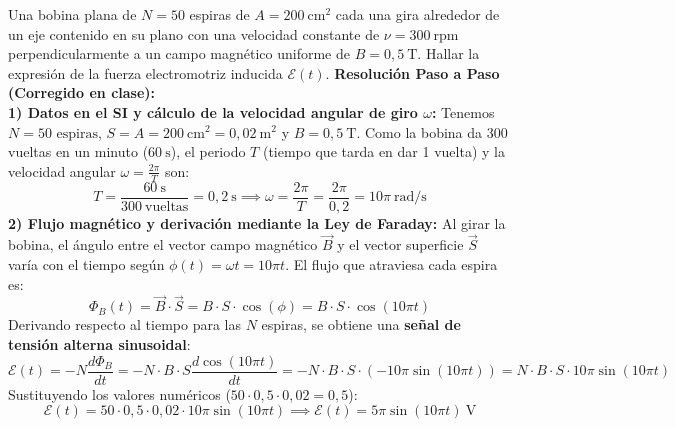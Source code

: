 \begin{ejercicio}
Una bobina plana de $N = 50$ espiras de $A = 200\ \si{\centi\meter\squared}$ cada una gira alrededor de un eje contenido en su plano con una velocidad constante de $\nu = 300\ \text{rpm}$ perpendicularmente a un campo magnético uniforme de $B = 0{,}5\ \si{\tesla}$. Hallar la expresión de la fuerza electromotriz inducida $\mathcal{E}(t)$.
\tcbline
\textbf{Resolución Paso a Paso (Corregido en clase):}\\[4pt]
\textbf{1) Datos en el SI y cálculo de la velocidad angular de giro $\omega$:}
Tenemos $N = 50\text{ espiras}$, $S = A = 200\ \si{\centi\meter\squared} = 0{,}02\ \si{\meter\squared}$ y $B = 0{,}5\ \si{\tesla}$. Como la bobina da $300$ vueltas en un minuto ($60\ \si{\second}$), el periodo $T$ (tiempo que tarda en dar 1 vuelta) y la velocidad angular $\omega = \frac{2\pi}{T}$ son:
\begin{equation}
    T = \frac{60\ \si{\second}}{300\ \text{vueltas}} = 0{,}2\ \si{\second} \implies \omega = \frac{2\pi}{T} = \frac{2\pi}{0{,}2} = 10\pi\ \si{\radian\per\second}
\end{equation}
\textbf{2) Flujo magnético y derivación mediante la Ley de Faraday:}
Al girar la bobina, el ángulo entre el vector campo magnético $\vec{B}$ y el vector superficie $\vec{S}$ varía con el tiempo según $\phi(t) = \omega t = 10\pi t$. El flujo que atraviesa cada espira es:
\begin{equation}
    \Phi_B(t) = \vec{B} \cdot \vec{S} = B \cdot S \cdot \cos(\phi) = B \cdot S \cdot \cos(10\pi t)
\end{equation}
Derivando respecto al tiempo para las $N$ espiras, se obtiene una \textbf{señal de tensión alterna sinusoidal}:
\begin{equation}
    \mathcal{E}(t) = -N \frac{d\Phi_B}{dt} = -N \cdot B \cdot S \frac{d\cos(10\pi t)}{dt} = -N \cdot B \cdot S \cdot (-10\pi \sin(10\pi t)) = N \cdot B \cdot S \cdot 10\pi \sin(10\pi t)
\end{equation}
Sustituyendo los valores numéricos ($50 \cdot 0{,}5 \cdot 0{,}02 = 0{,}5$):
\begin{equation}
    \mathcal{E}(t) = 50 \cdot 0{,}5 \cdot 0{,}02 \cdot 10\pi \sin(10\pi t) \implies \boxed{\mathcal{E}(t) = 5\pi \sin(10\pi t)\ \si{\volt}}
\end{equation}
\end{ejercicio}

